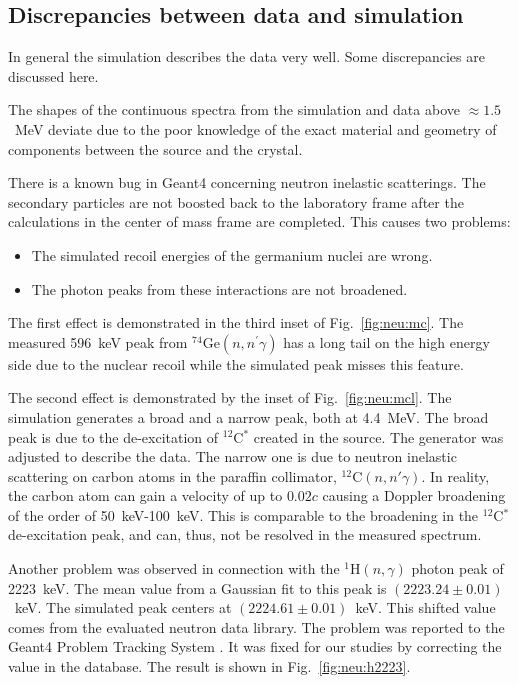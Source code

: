 \subsection{Discrepancies between data and simulation}
\label{sec:neu:dine}
In general the simulation describes the data very well. Some
discrepancies are discussed here.

The shapes of the continuous spectra from the simulation and data
above $\approx 1.5$~MeV deviate due to the poor knowledge of the exact
material and geometry of components between the source and the
crystal.

There is a known bug \cite{g4bug1} in Geant4 concerning neutron
inelastic scatterings. The secondary particles are not boosted back to
the laboratory frame after the calculations in the center of mass
frame are completed. This causes two problems:
\begin{itemize}
\item The simulated recoil energies of the germanium nuclei are wrong.
\item The photon peaks from these interactions are not broadened.
\end{itemize}

The first effect is demonstrated in the third inset of
Fig.~\ref{fig:neu:mc}. The measured 596~keV peak from
$^{74}$Ge$(n,n^\prime\gamma)$ has a long tail on the high energy side
due to the nuclear recoil while the simulated peak misses this
feature.

The second effect is demonstrated by the inset of
Fig.~\ref{fig:neu:mcl}.  The simulation generates a broad and a narrow
peak, both at 4.4~MeV.  The broad peak is due to the de-excitation of
$^{12}$C$^{*}$ created in the source. The generator was adjusted to
describe the data. The narrow one is due to neutron inelastic
scattering on carbon atoms in the paraffin collimator,
$^{12}$C$(n,n'\gamma)$. In reality, the carbon atom can gain a
velocity of up to $0.02c$ causing a Doppler broadening of the order of
50~keV-100~keV. This is comparable to the broadening in the
$^{12}$C$^{*}$ de-excitation peak, and can, thus, not be resolved in
the measured spectrum.

Another problem was observed in connection with the
$^{1}$H$(n,\gamma)$ photon peak of 2223~keV. The mean value from a
Gaussian fit to this peak is $(2223.24 \pm 0.01)$~keV. The simulated
peak centers at $(2224.61 \pm 0.01)$~keV. This shifted value comes
from the evaluated neutron data library. The problem was reported to
the Geant4 Problem Tracking System \cite{g4bug2}. It was fixed for our
studies by correcting the value in the database. The result is shown
in Fig.~\ref{fig:neu:h2223}.

